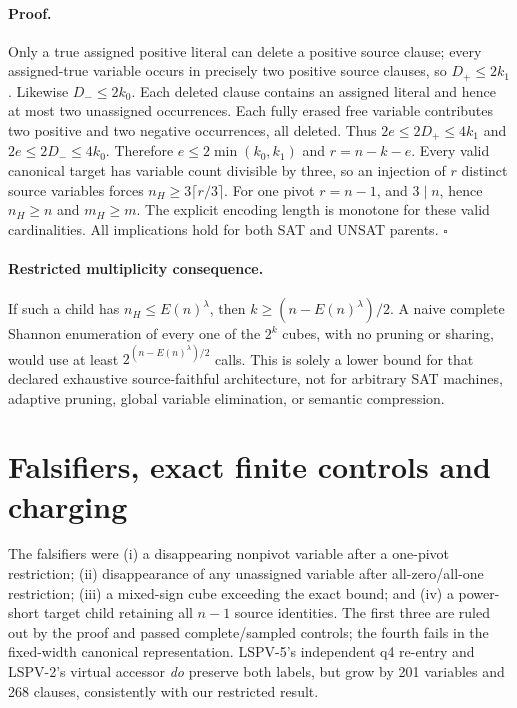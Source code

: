 \documentclass[10pt]{article}
\begin{document}
\paragraph{Proof.} Only a true assigned positive literal can delete a positive source clause; every assigned-true variable occurs in precisely two positive source clauses, so $D_+\le2k_1$. Likewise $D_-\le2k_0$. Each deleted clause contains an assigned literal and hence at most two unassigned occurrences. Each fully erased free variable contributes two positive and two negative occurrences, all deleted. Thus $2e\le2D_+\le4k_1$ and $2e\le2D_-\le4k_0$. Therefore $e\le2\min(k_0,k_1)$ and $r=n-k-e$. Every valid canonical target has variable count divisible by three, so an injection of $r$ distinct source variables forces $n_H\ge3\lceil r/3\rceil$. For one pivot $r=n-1$, and $3\mid n$, hence $n_H\ge n$ and $m_H\ge m$. The explicit encoding length is monotone for these valid cardinalities. All implications hold for both SAT and UNSAT parents. \hfill$\square$

\paragraph{Restricted multiplicity consequence.} If such a child has $n_H\le E(n)^\lambda$, then $k\ge(n-E(n)^\lambda)/2$. A naive complete Shannon enumeration of every one of the $2^k$ cubes, with no pruning or sharing, would use at least $2^{(n-E(n)^\lambda)/2}$ calls. This is solely a lower bound for that declared exhaustive source-faithful architecture, not for arbitrary SAT machines, adaptive pruning, global variable elimination, or semantic compression.

\section{Falsifiers, exact finite controls and charging}
The falsifiers were (i) a disappearing nonpivot variable after a one-pivot restriction; (ii) disappearance of any unassigned variable after all-zero/all-one restriction; (iii) a mixed-sign cube exceeding the exact bound; and (iv) a power-short target child retaining all $n-1$ source identities. The first three are ruled out by the proof and passed complete/sampled controls; the fourth fails in the fixed-width canonical representation. LSPV-5's independent q4 re-entry and LSPV-2's virtual accessor \emph{do} preserve both labels, but grow by 201 variables and 268 clauses, consistently with our restricted result.
\end{document}
